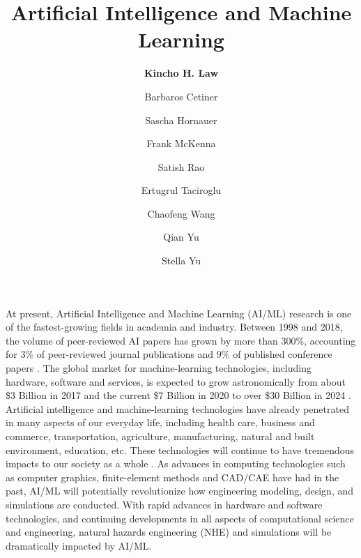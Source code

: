 %
%
%


\title{Artificial Intelligence and Machine Learning}
\author{
    \textbf{Kincho H. Law}
    \and {Barbaros Cetiner}
    \and {Sascha Hornauer}
    \and {Frank McKenna}
    \and {Satish Rao}
    \and {Ertugrul Taciroglu}
    \and {Chaofeng Wang}
    \and {Qian Yu}
    \and {Stella Yu}}
\tocauthor{}
%
%
\maketitle
\label{chapter:cc_aiml}

At present, Artificial Intelligence and Machine Learning (AI/ML) research is one of the fastest-growing fields in academia and industry. Between 1998 and 2018, the volume of peer-reviewed AI papers has grown by more than 300\%, accounting for 3\% of peer-reviewed journal publications and 9\% of published conference papers \citep{perrault2019ai}. The global market for machine-learning technologies, including hardware, software and services, is expected to grow astronomically from about \$3 Billion in 2017 and the current \$7 Billion in 2020 to over \$30 Billion in 2024 \citep{mrf2019machine}. Artificial intelligence and machine-learning technologies have already penetrated in many aspects of our everyday life, including health care, business and commerce, transportation, agriculture, manufacturing, natural and built environment, education, etc. These technologies will continue to have tremendous impacts to our society as a whole \citep{nstc2016preparing, nstc2016national, nstc2019national}. As advances in computing technologies such as computer graphics, finite-element methods and CAD/CAE have had in the past, AI/ML will potentially revolutionize how engineering modeling, design, and simulations are conducted. With rapid advances in hardware and software technologies, and continuing developments in all aspects of computational science and engineering, natural hazards engineering (NHE) and simulations will be dramatically impacted by AI/ML.

